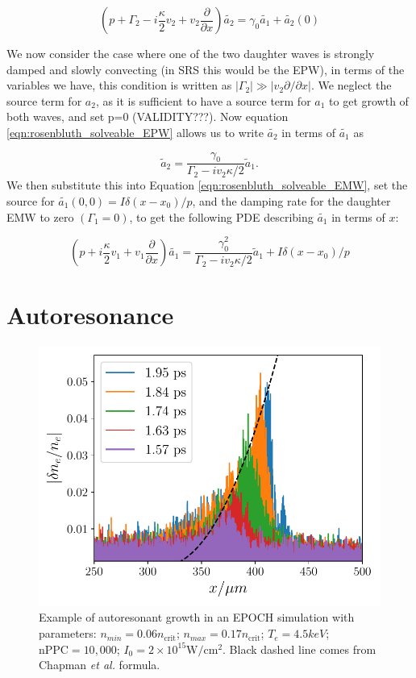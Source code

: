 \begin{equation}\label{eqn:rosenbluth_solveable_EPW}
	\left(p + \Gamma_2 - i\frac{\kappa}{2}v_2 + v_2\frac{\partial}{\partial x}\right)\tilde{a_2} = \gamma_0 \tilde{a_1} + \tilde{a_2}(0)
\end{equation}  

We now consider the case where one of the two daughter waves is strongly damped and slowly convecting (in SRS this would be the EPW), in terms of the variables we have, this condition is written as $|\Gamma_2| \gg |v_2\partial / \partial x|$. We neglect the source term for $a_2$, as it is sufficient to have a source term for $a_1$ to get growth of both waves, and set p=0 (VALIDITY???). Now equation \ref{eqn:rosenbluth_solveable_EPW} allows us to write $\tilde{a_2}$ in terms of $\tilde{a_1}$ as

\begin{equation}
	\tilde{a}_2 = \frac{\gamma_0}{\Gamma_2 - i v_2 \kappa/2}\tilde{a}_1.
\end{equation} We then substitute this into Equation \ref{eqn:rosenbluth_solveable_EMW}, set the source for $\tilde{a_1}(0,0) = I\delta(x-x_0)/p$, and the damping rate for the daughter EMW to zero $(\Gamma_1=0)$, to get the following PDE describing $\tilde{a_1}$ in terms of $x$:

\begin{equation}
	\left(p + i\frac{\kappa}{2}v_1 + v_1\frac{\partial}{\partial x}\right)\tilde{a_1} = \frac{\gamma_0^2}{\Gamma_2 - i v_2 \kappa/2}\tilde{a}_1 + I\delta(x-x_0)/p
\end{equation}



\section{Autoresonance}

\begin{figure}[ht]
    \centering
    \includegraphics[width=0.8\columnwidth]{Chapters/C2_Theory/AR_diagnostic.pdf}
    \caption{Example of autoresonant growth in an EPOCH simulation with parameters: $n_{min} = 0.06 n_{\text{crit}}$; $n_{max} = 0.17 n_{\text{crit}}$; $T_e = 4.5\si{keV}$; $\text{nPPC}=10,000$; $I_0 = 2 \times 10^{15}\si{\watt / \centi\metre^2}$. Black dashed line comes from Chapman \textit{et al.} \cite{Chapman2012} formula.}
    \label{fig:AR_diagnostic}
\end{figure}{}

%
%
